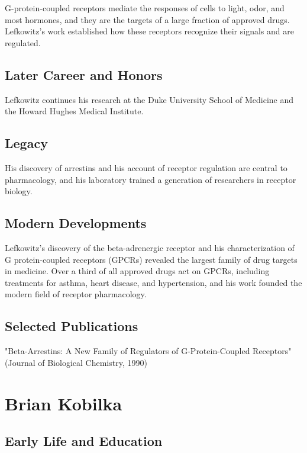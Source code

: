 G-protein-coupled receptors mediate the responses of cells to light, odor, and most hormones, and they are the targets of a large fraction of approved drugs. Lefkowitz's work established how these receptors recognize their signals and are regulated.

\subsection*{Later Career and Honors}

Lefkowitz continues his research at the Duke University School of Medicine and the Howard Hughes Medical Institute.

\subsection*{Legacy}

His discovery of arrestins and his account of receptor regulation are central to pharmacology, and his laboratory trained a generation of researchers in receptor biology.

\subsection*{Modern Developments}

Lefkowitz's discovery of the beta-adrenergic receptor and his characterization of G protein-coupled receptors (GPCRs) revealed the largest family of drug targets in medicine. Over a third of all approved drugs act on GPCRs, including treatments for asthma, heart disease, and hypertension, and his work founded the modern field of receptor pharmacology.

\subsection*{Selected Publications}

"Beta-Arrestins: A New Family of Regulators of G-Protein-Coupled Receptors" (Journal of Biological Chemistry, 1990)

\clearpage

\section{Brian Kobilka}

\subsection*{Early Life and Education}

